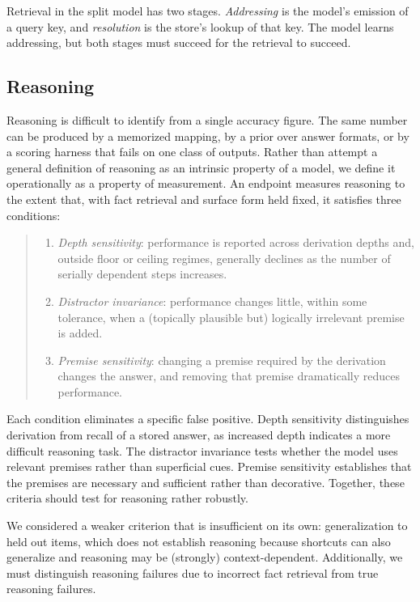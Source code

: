 \documentclass{article}
\begin{document}
Retrieval in the split model has two stages. \emph{Addressing} is the model's emission of a query key, and \emph{resolution} is the store's lookup of that key. The model learns addressing, but both stages must succeed for the retrieval to succeed.


\subsection{Reasoning}

Reasoning is difficult to identify from a single accuracy figure. The same number can be produced by a memorized mapping, by a prior over answer formats, or by a scoring harness that fails on one class of outputs. Rather than attempt a general definition of reasoning as an intrinsic property of a model, we define it operationally as a property of measurement. An endpoint measures reasoning to the extent that, with fact retrieval and surface form held fixed, it satisfies three conditions:

\begin{quote}
\begin{enumerate}
\item \emph{Depth sensitivity}: performance is reported across derivation depths and, outside floor or ceiling regimes, generally declines as the number of serially dependent steps increases.
\item \emph{Distractor invariance}: performance changes little, within some tolerance, when a (topically plausible but) logically irrelevant premise is added.
\item \emph{Premise sensitivity}: changing a premise required by the derivation changes the answer, and removing that premise dramatically reduces performance.\end{enumerate}
\end{quote}

Each condition eliminates a specific false positive. Depth sensitivity distinguishes derivation from recall of a stored answer, as increased depth indicates a more difficult reasoning task. The distractor invariance tests whether the model uses relevant premises rather than superficial cues. Premise sensitivity establishes that the premises are necessary and sufficient rather than decorative. Together, these criteria should test for reasoning rather robustly.

We considered a weaker criterion that is insufficient on its own: generalization to held out items, which does not establish reasoning because shortcuts can also generalize \citep{geirhos2020shortcut} and reasoning may be (strongly) context-dependent. Additionally, we must distinguish reasoning failures due to incorrect fact retrieval from true reasoning failures.
\end{document}
